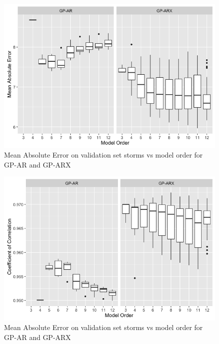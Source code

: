 \documentclass[sw, draft]{AGUTeX}
\begin{document}
\begin{figure}
\noindent\includegraphics[width=\textwidth]{Compare-mae.png}
\caption{Mean Absolute Error on validation set storms vs model order for GP-AR and GP-ARX}
\label{fig:CompareMae}
\end{figure}

\begin{figure}
\noindent\includegraphics[width=\textwidth]{Compare-cc.png}
\caption{Mean Absolute Error on validation set storms vs model order for GP-AR and GP-ARX}
\label{fig:CompareCC}
\end{figure}
\end{document}
